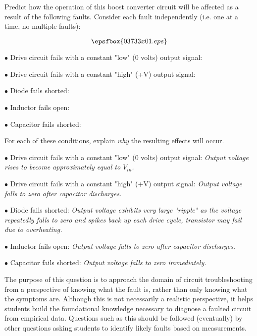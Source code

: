 

Predict how the operation of this boost converter circuit will be affected as a result of the following faults.  Consider each fault independently (i.e. one at a time, no multiple faults):

$$\epsfbox{03733x01.eps}$$

\medskip
\item{$\bullet$} Drive circuit fails with a constant "low" (0 volts) output signal:
\vskip 5pt
\item{$\bullet$} Drive circuit fails with a constant "high" (+V) output signal:
\vskip 5pt
\item{$\bullet$} Diode fails shorted:
\vskip 5pt
\item{$\bullet$} Inductor fails open:
\vskip 5pt
\item{$\bullet$} Capacitor fails shorted:
\medskip

For each of these conditions, explain {\it why} the resulting effects will occur.







\medskip
\item{$\bullet$} Drive circuit fails with a constant "low" (0 volts) output signal: {\it Output voltage rises to become approximately equal to $V_{in}$.}
\vskip 5pt
\item{$\bullet$} Drive circuit fails with a constant "high" (+V) output signal:  {\it Output voltage falls to zero after capacitor discharges.}
\vskip 5pt
\item{$\bullet$} Diode fails shorted: {\it Output voltage exhibits very large "ripple" as the voltage repeatedly falls to zero and spikes back up each drive cycle, transistor may fail due to overheating.}
\vskip 5pt
\item{$\bullet$} Inductor fails open: {\it Output voltage falls to zero after capacitor discharges.}
\vskip 5pt
\item{$\bullet$} Capacitor fails shorted: {\it Output voltage falls to zero immediately.}
\medskip







The purpose of this question is to approach the domain of circuit troubleshooting from a perspective of knowing what the fault is, rather than only knowing what the symptoms are.  Although this is not necessarily a realistic perspective, it helps students build the foundational knowledge necessary to diagnose a faulted circuit from empirical data.  Questions such as this should be followed (eventually) by other questions asking students to identify likely faults based on measurements.




